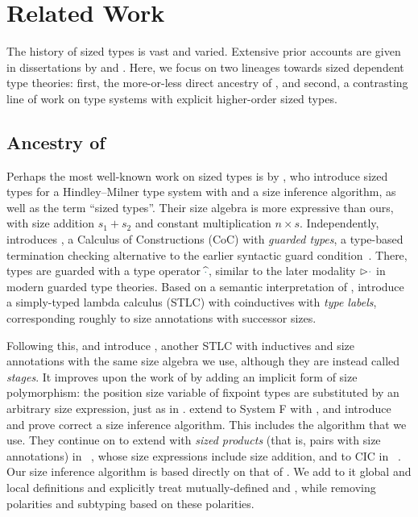 \section{Related Work}\label{sec:related}

The history of sized types is vast and varied.
Extensive prior accounts are given in dissertations by \citet{lambda-hat-diss} and \citet{abel-diss}.
Here, we focus on two lineages towards sized dependent type theories: first, the more-or-less direct ancestry of \lang, and second, a contrasting line of work on type systems with explicit higher-order sized types.

\subsection{Ancestry of \titlelang}

Perhaps the most well-known work on sized types is by \citet{hughes},
who introduce sized types for a Hindley--Milner type system with \coinductives and a size inference algorithm,
as well as the term ``sized types''.
Their size algebra is more expressive than ours, with size addition $s_1 + s_2$ and constant multiplication $n \times s$.
Independently, \citet{ccr} introduces \CCR, a Calculus of Constructions (CoC) with \textit{guarded types},
a type-based termination checking alternative to the earlier syntactic guard condition~\citep{guard-condition}.
There, types are guarded with a type operator $\widehat{\ph}$,
similar to the later modality $\rhd \ph$ in modern guarded type theories.
Based on a semantic interpretation of \CCR,
\citet{acg} introduce a simply-typed lambda calculus (STLC) with coinductives with \textit{type labels},
corresponding roughly to size annotations with successor sizes.

Following this, \citet{lambda-hat} and \citet{lambda-hat-diss} introduce \lambdahat,
another STLC with inductives and size annotations with the same size algebra we use,
although they are instead called \textit{stages}.
It improves upon the work of \citet{acg} by adding an implicit form of size polymorphism:
the position size variable of fixpoint types are substituted by an arbitrary size expression,
just as in .
\citet{f-hat} extend \lambdahat to System F with \Fhat, and introduce and prove correct a size inference algorithm.
This includes the \RecCheck algorithm that we use.
They continue on to extend \Fhat with \textit{sized products} (that is, pairs with size annotations) in \FXhat~\citep{fx-hat}, whose size expressions include size addition, and to CIC in \CIChat~\citep{cic-hat}.
Our size inference algorithm is based directly on that of \CIChat.
We add to it global and local definitions and explicitly treat mutually-defined \coinductives and \cofixpoints,
while removing polarities and subtyping based on these polarities.

